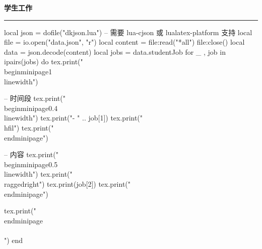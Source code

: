 \documentclass[10pt, a4paper, oneside]{ctexart}
\begin{document}
\ifdefined\studentJob
\begin{minipage}{1\textwidth}
    \large{\ifdefined\showIcon \makebox[\iconAlignWide][c]{\faBriefcase} \fi \textbf{学生工作}}
\end{minipage}
\rule{\linewidth}{\lineSize}
\begin{center}
    \begin{minipage}{0.9\textwidth}
        \begin{luacode}
            local json = dofile("dkjson.lua")  -- 需要 lua-cjson 或 lualatex-platform 支持
            local file = io.open("data.json", "r")
            local content = file:read("*all")
            file:close()
            local data = json.decode(content)
            local jobs = data.studentJob
            for _ , job in ipairs(jobs) do
                tex.print("\\begin{minipage}{1\\linewidth}")

                -- 时间段
                tex.print("\\begin{minipage}{0.4\\linewidth}")
                tex.print("- " .. job[1])
                tex.print("\\hfil")
                tex.print("\\end{minipage}")

                -- 内容
                tex.print("\\begin{minipage}{0.5\\linewidth}")
                tex.print("\\raggedright")
                tex.print(job[2])
                tex.print("\\end{minipage}")

                tex.print("\\end{minipage}\\\\[0.5em]")
            end
        \end{luacode}
    \end{minipage}
\end{center}
\fi
\end{document}
